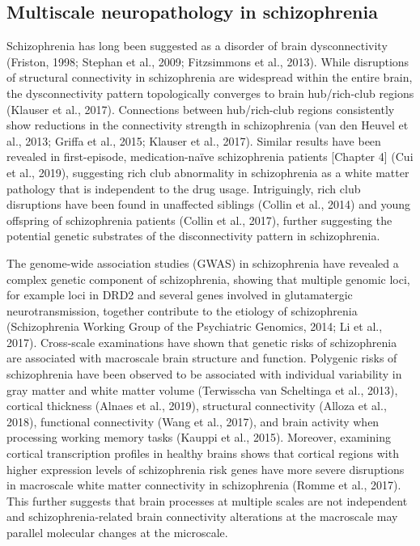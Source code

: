 \begin{refsection}
\subsection*{Multiscale neuropathology in schizophrenia}
Schizophrenia has long been suggested as a disorder of brain dysconnectivity (Friston, 1998; Stephan et al., 2009; Fitzsimmons et al., 2013). While disruptions of structural connectivity in schizophrenia are widespread within the entire brain, the dysconnectivity pattern topologically converges to brain hub/rich-club regions (Klauser et al., 2017). Connections between hub/rich-club regions consistently show reductions in the connectivity strength in schizophrenia (van den Heuvel et al., 2013; Griffa et al., 2015; Klauser et al., 2017). Similar results have been revealed in first-episode, medication-naïve schizophrenia patients [Chapter 4] (Cui et al., 2019), suggesting rich club abnormality in schizophrenia as a white matter pathology that is independent to the drug usage. Intriguingly, rich club disruptions have been found in unaffected siblings (Collin et al., 2014) and young offspring of schizophrenia patients (Collin et al., 2017), further suggesting the potential genetic substrates of the disconnectivity pattern in schizophrenia.

The genome-wide association studies (GWAS) in schizophrenia have revealed a complex genetic component of schizophrenia, showing that multiple genomic loci, for example loci in DRD2 and several genes involved in glutamatergic neurotransmission,  together contribute to the etiology of schizophrenia (Schizophrenia Working Group of the Psychiatric Genomics, 2014; Li et al., 2017). Cross-scale examinations have shown that genetic risks of schizophrenia are associated with macroscale brain structure and function. Polygenic risks of schizophrenia have been observed to be associated with individual variability in gray matter and white matter volume (Terwisscha van Scheltinga et al., 2013), cortical thickness (Alnaes et al., 2019), structural connectivity (Alloza et al., 2018), functional connectivity (Wang et al., 2017), and brain activity when processing working memory tasks (Kauppi et al., 2015). Moreover, examining cortical transcription profiles in healthy brains shows that cortical regions with higher expression levels of schizophrenia risk genes have more severe disruptions in macroscale white matter connectivity in schizophrenia (Romme et al., 2017). This further suggests that brain processes at multiple scales are not independent and schizophrenia-related brain connectivity alterations at the macroscale may parallel molecular changes at the microscale.


\end{refsection}
